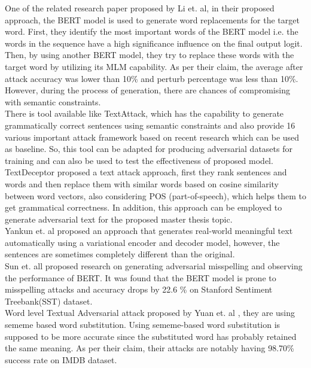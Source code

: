 \documentclass[%
	BCOR=8mm, %
	DIV=12, 
	toc=bibliography, %
	toc=listof, %
	oneside, %
	egregdoesnotlikesansseriftitles, %
	]{scrbook}
\begin{document}
One of the related research paper proposed by Li et$.$ al\cite{li_bert-attack_2020}, in their proposed approach, the BERT model is used to generate word replacements for the target word. 
First, they identify the most important words of the BERT model i.e. the words in the sequence have a high significance influence on the final output logit. Then, by using another BERT model,
 they try to replace these words with the target word by utilizing its MLM capability. As per their claim, the average after attack accuracy was lower than 10\% and perturb percentage was less 
 than 10\%.   However, during the process of generation, there are chances of compromising with semantic constraints.\\
 
 There is tool available like TextAttack, which has the capability to generate grammatically correct sentences using semantic constraints  and also provide 16 various important attack 
 framework based on recent research which can be used as baseline. So, this tool can be adapted for producing adversarial datasets for training and can also be used to test the effectiveness of 
 proposed model.\\
 
TextDeceptor \cite{saxena_textdecepter_2020} proposed a text attack approach, first they rank sentences and words and then replace them with similar words based on cosine similarity 
between word vectors, also considering POS (part-of-speech), which helps them to get grammatical correctness. In addition, this approach can be employed to generate adversarial text 
for the proposed master thesis topic.  \\

Yankun et$.$ al\cite{ren_generating_2020} proposed an approach that generates real-world meaningful text automatically using a variational encoder and decoder model, however, 
the sentences are sometimes completely different than the original.\\

Sun et$.$ all \cite{sun_adv-bert_2020} proposed research on generating adversarial misspelling and observing the performance of BERT. It was found that the BERT model is prone
 to misspelling attacks and accuracy drops by 22.6 \% on Stanford Sentiment Treebank(SST) dataset.\\
 
Word level Textual Adversarial attack proposed by Yuan et$.$ al \cite{zang_word-level_2019}, they are using sememe based word substitution. Using sememe-based word substitution 
is supposed to be more accurate since the substituted word has probably retained the same meaning. As per their claim, their attacks are notably having 98.70\% success rate on IMDB dataset. \\
\end{document}
